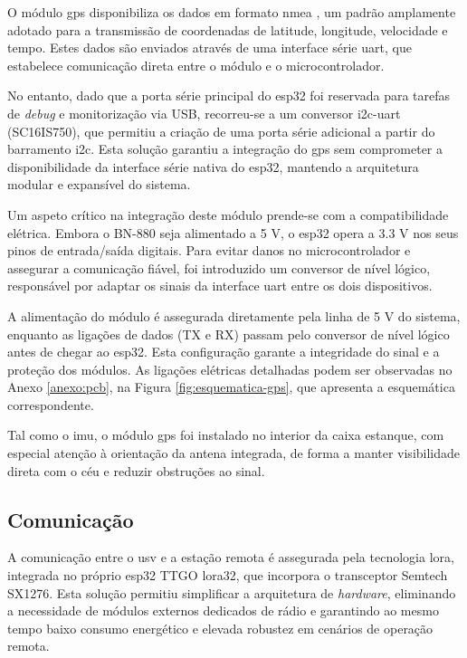 O módulo \gls{gps} disponibiliza os dados em formato \gls{nmea} \cite{nmea}, um padrão amplamente adotado para a transmissão de coordenadas de latitude, longitude, velocidade e tempo. Estes dados são enviados através de uma interface série \gls{uart}, que estabelece comunicação direta entre o módulo e o microcontrolador.  

No entanto, dado que a porta série principal do \gls{esp32} foi reservada para tarefas de \emph{debug} e monitorização via USB, recorreu-se a um conversor \gls{i2c}-\gls{uart} (SC16IS750), que permitiu a criação de uma porta série adicional a partir do barramento \gls{i2c}. Esta solução garantiu a integração do \gls{gps} sem comprometer a disponibilidade da interface série nativa do \gls{esp32}, mantendo a arquitetura modular e expansível do sistema.  

Um aspeto crítico na integração deste módulo prende-se com a compatibilidade elétrica. Embora o BN-880 seja alimentado a 5 V, o \gls{esp32} opera a 3.3 V nos seus pinos de entrada/saída digitais. Para evitar danos no microcontrolador e assegurar a comunicação fiável, foi introduzido um conversor de nível lógico, responsável por adaptar os sinais da interface \gls{uart} entre os dois dispositivos.  

A alimentação do módulo é assegurada diretamente pela linha de 5 V do sistema, enquanto as ligações de dados (TX e RX) passam pelo conversor de nível lógico antes de chegar ao \gls{esp32}. Esta configuração garante a integridade do sinal e a proteção dos módulos. As ligações elétricas detalhadas podem ser observadas no Anexo \ref{anexo:pcb}, na Figura \ref{fig:esquematica-gps}, que apresenta a esquemática correspondente.  

Tal como o \gls{imu}, o módulo \gls{gps} foi instalado no interior da caixa estanque, com especial atenção à orientação da antena integrada, de forma a manter visibilidade direta com o céu e reduzir obstruções ao sinal.

\subsection{Comunicação}

A comunicação entre o \gls{usv} e a estação remota é assegurada pela tecnologia \acrfull{lora}, integrada no próprio \gls{esp32} TTGO \gls{lora}32, que incorpora o transceptor Semtech SX1276. Esta solução permitiu simplificar a arquitetura de \emph{hardware}, eliminando a necessidade de módulos externos dedicados de rádio e garantindo ao mesmo tempo baixo consumo energético e elevada robustez em cenários de operação remota.  

